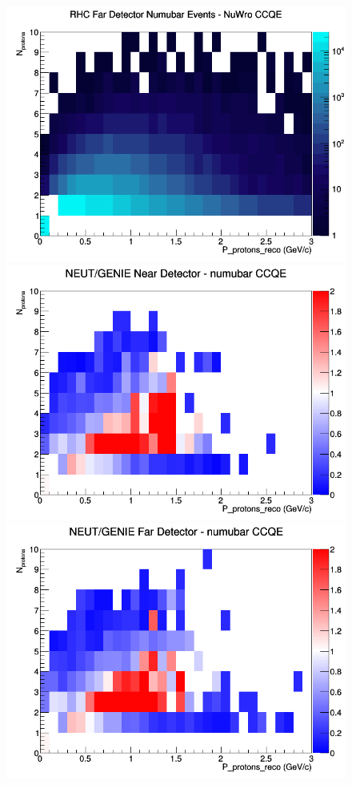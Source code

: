 \documentclass[12pt]{article}
\begin{document}
\begin{figure}[h]
\endminipage
{}
\includegraphics[width=\linewidth]{eff_N_P/LAr/protons/CCQE_RHC_FD_numubar_N_P_NuWro.png}
\endminipage
\newline
{}
\includegraphics[width=\linewidth]{eff_N_P/LAr/protons/ratios/CCQE_NEUT_GENIE_numubar_near_N_P.png}
\endminipage
{}
\includegraphics[width=\linewidth]{eff_N_P/LAr/protons/ratios/CCQE_NEUT_GENIE_numubar_far_N_P.png}

\end{figure}
\end{document}

